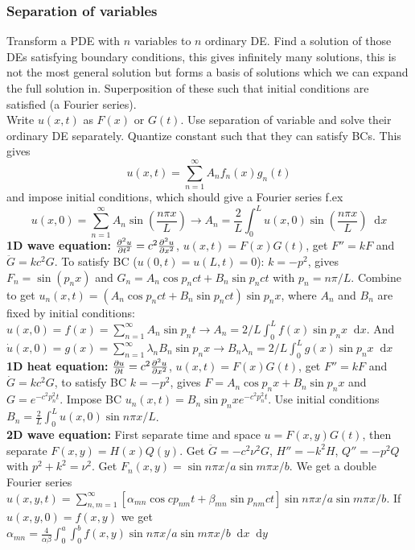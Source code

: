 \documentclass[a4paper, 10pt]{article}
\newcommand*\diff{\mathop{}\!\mathrm{d}}
\begin{document}
\begin{multicols*}{3}
\subsubsection*{Separation of variables}
Transform a PDE with $n$ variables to $n$ ordinary DE. Find a solution of those DEs satisfying boundary conditions, this gives infinitely many solutions, this is not the most general solution but forms a basis of solutions which we can expand the full solution in. Superposition of these such that initial conditions are satisfied (a Fourier series).\\
Write $u(x,t)$ as $F(x)$ or $G(t)$. Use separation of variable and solve their ordinary DE separately. Quantize constant such that they can satisfy BCs. This gives
$$ u(x,t) = \sum_{n=1}^{\infty} A_n f_n(x)g_n(t)$$
and impose initial conditions, which should give a Fourier series f.ex
$$ u(x,0) = \sum_{n=1}^\infty A_n \sin{\left( \frac{n\pi x}{L} \right)} \rightarrow A_n = \frac{2}{L}\int_0^L u(x,0) \sin{\left( \frac{n\pi x}{L} \right)} \diff x$$
\textbf{1D wave equation:} $\pdv[2]{u}{t} = c^2\pdv[2]{u}{x}$, $u(x,t) = F(x)G(t)$, get $F'' = kF$ and $\ddot{G} = kc^2G$. To satisfy BC ($u(0,t) = u(L,t)=0$): $k=-p^2$, gives $F_n = \sin{\left(p_nx\right)}$ and $G_n = A_n \cos{p_nc t} + B_n\sin{p_nc t}$ with $p_n=n\pi/L$.
Combine to get $u_n(x,t) = \left(A_n \cos{p_nc t} + B_n\sin{p_nc t}\right)\sin{p_nx}$, where $A_n$ and $B_n$ are fixed by initial conditions: $u(x,0) = f(x) = \sum_{n=1}^{\infty}A_n \sin{p_n t} \rightarrow A_n = 2/L \int_0^Lf(x)\sin{p_nx}\diff x$. And $\dot{u}(x,0)=g(x)=\sum_{n=1}^{\infty}\lambda_nB_n\sin{p_nx} \rightarrow B_n\lambda_n = 2/L \int_0^L g(x)\sin{p_nx}\diff x$ \\
\textbf{1D heat equation:} $\pdv{u}{t} = c^2\pdv[2]{u}{x}$, $u(x,t) = F(x)G(t)$, get $F'' = kF$ and $\dot{G} = kc^2G$, to satisfy BC $k=-p^2$, gives $F=A_n\cos{p_nx}+B_n\sin{p_nx}$ and $G = e^{-c^2p_n^2t}$. Impose BC $u_n(x,t) = B_n\sin{p_nx}e^{-c^2p_n^2t}$. Use initial conditions $B_n=\frac{2}{L}\int_0^Lu(x,0)\sin{n\pi x/L}$.\\
\textbf{2D wave equation:} First separate time and space $u = F(x,y)G(t)$, then separate $F(x,y) = H(x)Q(y)$. Get $\ddot{G}=-c^2\nu^2G$, $H'' = -k^2H$, $Q'' = -p^2Q$ with $p^2+k^2 = \nu^2$. Get $F_{n}(x,y) = \sin{n\pi x/a}\sin{m\pi x/b}$. We get a double Fourier series
$u(x,y,t) = \sum_{n,m=1}^{\infty}[\alpha_{mn}\cos{cp_{nm}t} + \beta_{mn}\sin{p_{nm}ct}]\sin{n\pi x/a}\sin{m\pi x/b}$. If $u(x,y,0) = f(x,y)$ we get
$\alpha_{mn} = \frac{4}{\alpha\beta}\int_0^a\int_0^b f(x,y)\sin{n\pi x/a}\sin{m\pi x/b} \diff x \diff y$


\end{multicols*}
\end{document}
